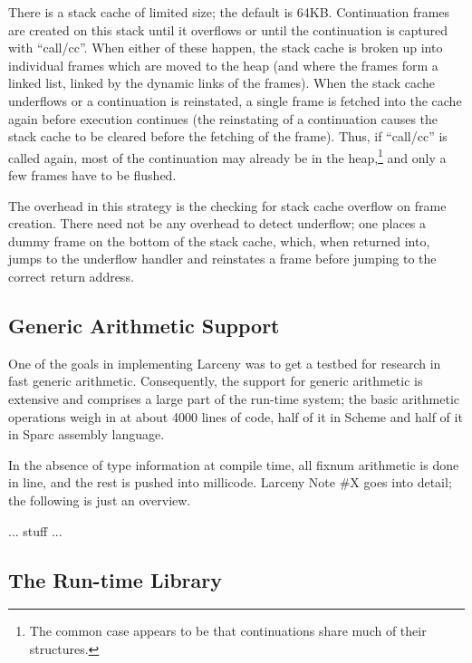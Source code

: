 There is a stack cache of limited size; the default is 64KB.
Continuation frames are created on this stack until it overflows or
until the continuation is captured with ``call/cc''. When either of
these happen, the stack cache is broken up into individual frames
which are moved to the heap (and where the frames form a linked list,
linked by the dynamic links of the frames). When the stack cache
underflows or a continuation is reinstated, a single frame is fetched
into the cache again before execution continues (the reinstating of a
continuation causes the stack cache to be cleared before the fetching
of the frame). Thus, if ``call/cc'' is called again, most of the
continuation may already be in the heap,\footnote{The common case
appears to be that continuations share much of their structures.} and
only a few frames have to be flushed.

The overhead in this strategy is the checking for stack cache overflow
on frame creation. There need not be any overhead to detect underflow;
one places a dummy frame on the bottom of the stack cache, which, when
returned into, jumps to the underflow handler and reinstates a frame
before jumping to the correct return address.

\subsection{Generic Arithmetic Support}

One of the goals in implementing Larceny was to get a testbed for
research in fast generic arithmetic. Consequently, the support for
generic arithmetic is extensive and comprises a large part of the
run-time system; the basic arithmetic operations weigh in at about
4000 lines of code, half of it in Scheme and half of it in Sparc
assembly language.

In the absence of type information at compile time, all fixnum
arithmetic is done in line, and the rest is pushed into millicode.
Larceny Note \#X goes into detail; the following is just an overview.

... stuff ...

\subsection{The Run-time Library}


